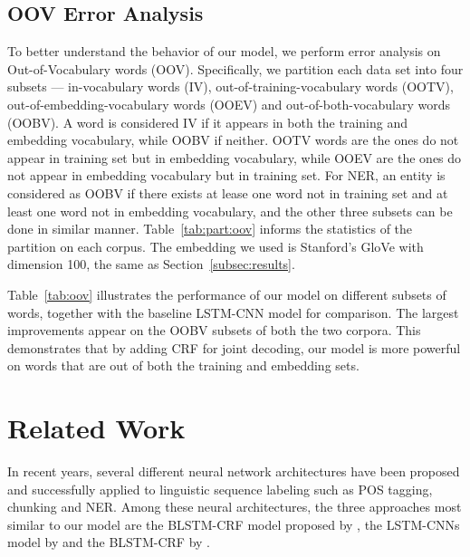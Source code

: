 \documentclass[11pt]{article}
\begin{document}
\subsection{OOV Error Analysis}
To better understand the behavior of our model, we perform error analysis on Out-of-Vocabulary words (OOV). Specifically, we partition each data set into four subsets --- in-vocabulary words (IV), out-of-training-vocabulary words (OOTV), out-of-embedding-vocabulary words (OOEV) and out-of-both-vocabulary words (OOBV). A word is considered IV if it appears in both the training and embedding vocabulary, while OOBV if neither. OOTV words are the ones do not appear in training set but in embedding vocabulary, while OOEV are the ones do not appear in embedding vocabulary but in training set. For NER, an entity is considered as OOBV if there exists at lease one word not in training set and at least one word not in embedding vocabulary, and the other three subsets can be done in similar manner. Table~\ref{tab:part:oov}
informs the statistics of the partition on each corpus. The embedding we used is Stanford's GloVe with dimension 100, the same as Section~\ref{subsec:results}.

Table~\ref{tab:oov} illustrates the performance of our model on different subsets of words, together with the baseline LSTM-CNN model for comparison. The largest improvements appear on the OOBV subsets of both the two corpora. This demonstrates that by adding CRF for joint decoding, our model is more powerful on words that are out of both the training and embedding sets.

\section{Related Work}
In recent years, several different neural network architectures have been proposed and successfully applied to linguistic sequence labeling such as POS tagging, chunking and NER. Among these neural architectures, the three approaches most similar to our model are the BLSTM-CRF model proposed by , the LSTM-CNNs model by  and the BLSTM-CRF by .
\end{document}
